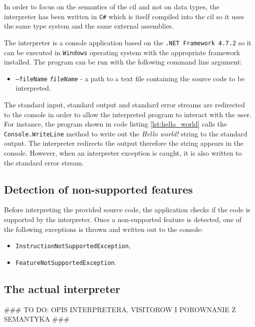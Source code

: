 \documentclass{article}
\numberwithin{equation}{section}
\begin{document}
In order to focus on the semantics of the \acrshort{cil} and not on data types, the interpreter has been written in \texttt{C\#} which is itself compiled into the \acrshort{cil} so it uses the same type system and the same external assemblies. 

The interpreter is a console application based on the \texttt{.NET Framework 4.7.2} so it can be executed in \texttt{Windows} operating system with the appropriate framework installed. The program can be run with the following command line argument:
\begin{itemize}
	\item{\texttt{--fileName} \texttt{\textit{fileName}} - a path to a text file containing the source code to be interpreted.}
\end{itemize}

The standard input, standard output and standard error streams are redirected to the console in order to allow the interpreted program to interact with the user. For instance, the program shown in code listing \ref{lst:hello_world} calls the \texttt{Console.WriteLine} method to write out the \textit{Hello world!} string to the standard output. The interpreter redirects the output therefore the string appears in the console. However, when an interpreter exception is caught, it is also written to the standard error stream.

\subsection{Detection of non-supported features}

Before interpreting the provided source code, the application checks if the code is supported by the interpreter. Once a non-supported feature is detected, one of the following exceptions is thrown and written out to the console:
\begin{itemize}
	\item{\texttt{InstructionNotSupportedException},}
	\item{\texttt{FeatureNotSupportedException}.}
\end{itemize}

\subsection{The actual interpreter}

\#\#\# TO DO: OPIS INTERPRETERA, VISITOROW I POROWNANIE Z SEMANTYKA \#\#\#

\clearpage
\end{document}

